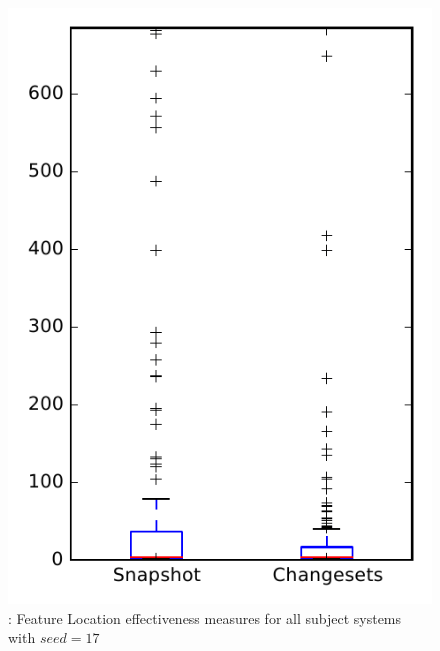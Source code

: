 
\begin{figure}
\centering
\includegraphics[height=0.4\textheight]{figures/flt_seed/rq1_overview_17}
\caption{\rone: Feature Location effectiveness measures for all subject systems with $seed=17$}
\label{fig:flt_seed:rq1:overview}
\end{figure}
